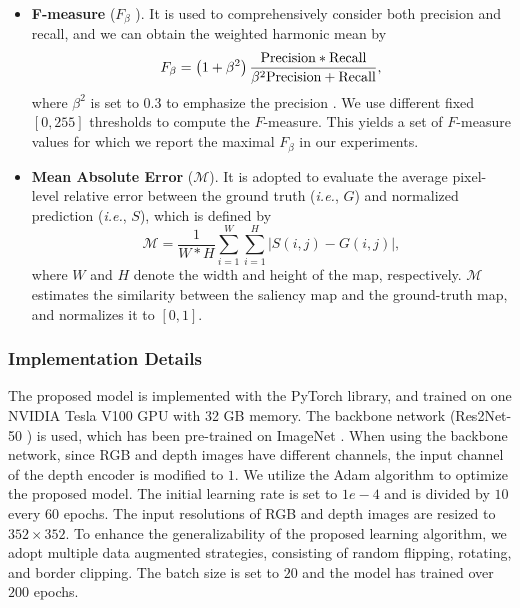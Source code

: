 \documentclass[10pt,twocolumn,letterpaper]{article}
\def\ie{\emph{i.e.}}
\begin{document}
\begin{itemize}{\setlength{\parsep}{-0.25ex}}
\item \textbf{F-measure} ($F_{\beta}$ \cite{achanta2009frequency}). It is used to comprehensively consider both precision and recall, and we can obtain the weighted harmonic mean by
\begin{equation}
\begin{aligned}
F_{\beta}=\left(1+\beta ^2\right)\frac{\textup{Precision}*\textup{Recall}}{\beta^{2}\textup{Precision}+\textup{Recall}},
\end{aligned}
\end{equation}
where $\beta^2$ is set to $0.3$ to emphasize the precision \cite{achanta2009frequency}. We use different fixed $[0,255]$ thresholds to compute the $F$-measure. This yields a set of $F$-measure values for which we report the maximal $F_{\beta}$ in our experiments.

\item \textbf{Mean Absolute Error} ($\mathcal{M}$). It is adopted to evaluate the average pixel-level relative error between the ground truth (\ie, $G$) and normalized prediction (\ie, $S$), which is defined by
\begin{equation}
\mathcal{M}=\frac{1}{W*H}\sum_{i=1}^{W}\sum_{i=1}^{H}\left|S\left(i,j\right)-G\left(i,j\right) \right|,
\end{equation}
where $W$ and $H$ denote the width and height of the map, respectively. $\mathcal{M}$ estimates the similarity between the saliency map and the ground-truth map, and normalizes it to $[0,1]$.\\

\end{itemize}



\subsubsection{Implementation Details}

The proposed model is implemented with the PyTorch library, and trained on one NVIDIA Tesla V100 GPU with 32 GB memory. The backbone network (Res2Net-50 \cite{pami20Res2net}) is used, which has been pre-trained on ImageNet \cite{russakovsky2015imagenet}. When using the backbone network, since RGB and depth images have different channels, the input channel of the depth encoder is modified to $1$. We utilize the Adam algorithm to optimize the proposed model. The initial learning rate is set to $1e-4$ and is divided by $10$ every $60$ epochs. The input resolutions of RGB and depth images are resized to $352\times{352}$. To enhance the generalizability of the proposed learning algorithm, we adopt multiple data augmented strategies, consisting of random flipping, rotating, and border clipping. The batch size is set to $20$ and the model has trained over $200$ epochs.
\end{document}
